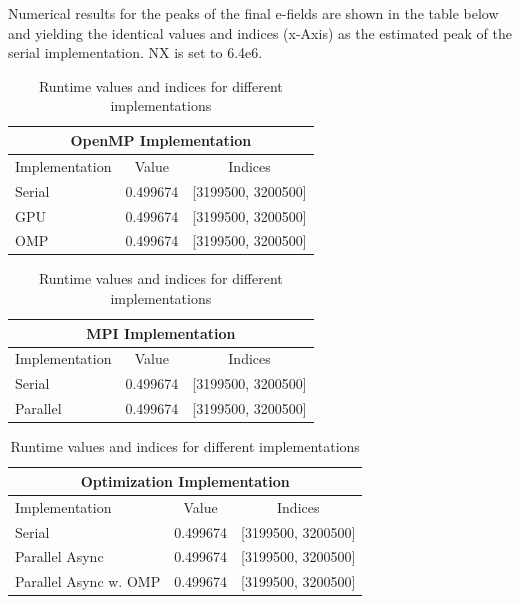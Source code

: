 \documentclass[a4paper,10pt]{article}
\begin{document}
Numerical results for the peaks of the final e-fields are shown in the table below and yielding the identical values and indices (x-Axis) as the estimated peak of the serial implementation.
NX is set to 6.4e6.
\begin{table}[H]
  \centering
  \caption{Runtime values and indices for different implementations}
  \label{tab:5_numerical_verification}
  
  \begin{tabular}{|l|c|c|}
    \multicolumn{3}{c}{\textbf{OpenMP Implementation}} \\
    \hline
    Implementation & Value & Indices \\
    \hline
    Serial   & 0.499674 & [3199500, 3200500] \\
    GPU      & 0.499674 & [3199500, 3200500] \\
    OMP      & 0.499674 & [3199500, 3200500] \\
    \hline
  \end{tabular}
  \vspace{1em}

  \begin{tabular}{|l|c|c|}
    \multicolumn{3}{c}{\textbf{MPI Implementation}} \\
    \hline
    Implementation & Value & Indices \\
    \hline
    Serial   & 0.499674 & [3199500, 3200500] \\
    Parallel & 0.499674 & [3199500, 3200500] \\
    \hline
  \end{tabular}
  \vspace{1em}

  \begin{tabular}{|l|c|c|}
    \multicolumn{3}{c}{\textbf{Optimization Implementation}} \\
    \hline
    Implementation & Value & Indices \\
    \hline
    Serial                    & 0.499674 & [3199500, 3200500] \\
    Parallel Async            & 0.499674 & [3199500, 3200500] \\
    Parallel Async w. OMP     & 0.499674 & [3199500, 3200500] \\
    \hline
  \end{tabular}
\end{table}
\end{document}
